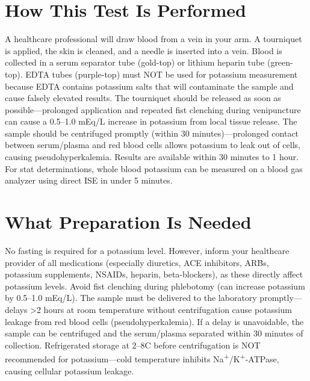 \section*{How This Test Is Performed}
A healthcare professional will draw blood from a vein in your arm. A tourniquet is applied, the skin is cleaned, and a needle is inserted into a vein. Blood is collected in a serum separator tube (gold-top) or lithium heparin tube (green-top). EDTA tubes (purple-top) must NOT be used for potassium measurement because EDTA contains potassium salts that will contaminate the sample and cause falsely elevated results. The tourniquet should be released as soon as possible---prolonged application and repeated fist clenching during venipuncture can cause a 0.5--1.0 mEq/L increase in potassium from local tissue release. The sample should be centrifuged promptly (within 30 minutes)---prolonged contact between serum/plasma and red blood cells allows potassium to leak out of cells, causing pseudohyperkalemia. Results are available within 30 minutes to 1 hour. For stat determinations, whole blood potassium can be measured on a blood gas analyzer using direct ISE in under 5 minutes.

\section*{What Preparation Is Needed}
No fasting is required for a potassium level. However, inform your healthcare provider of all medications (especially diuretics, ACE inhibitors, ARBs, potassium supplements, NSAIDs, heparin, beta-blockers), as these directly affect potassium levels. Avoid fist clenching during phlebotomy (can increase potassium by 0.5--1.0 mEq/L). The sample must be delivered to the laboratory promptly---delays >2 hours at room temperature without centrifugation cause potassium leakage from red blood cells (pseudohyperkalemia). If a delay is unavoidable, the sample can be centrifuged and the serum/plasma separated within 30 minutes of collection. Refrigerated storage at 2--8\textdegree C before centrifugation is NOT recommended for potassium---cold temperature inhibits Na\textsuperscript{+}/K\textsuperscript{+}-ATPase, causing cellular potassium leakage.

